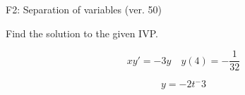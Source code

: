 \begin{exercise}
  \begin{exerciseTitle}F2: Separation of variables (ver. 50)\end{exerciseTitle}
  \begin{exerciseStatement}
    
Find the solution to the given IVP.

    
\[xy'= -3 y \hspace{1em} y( 4 ) = -\frac{1}{32}\]

  \end{exerciseStatement}
  \begin{exerciseAnswer}
    
\[y= -2 t^ -3\]

  \end{exerciseAnswer}
\end{exercise}
